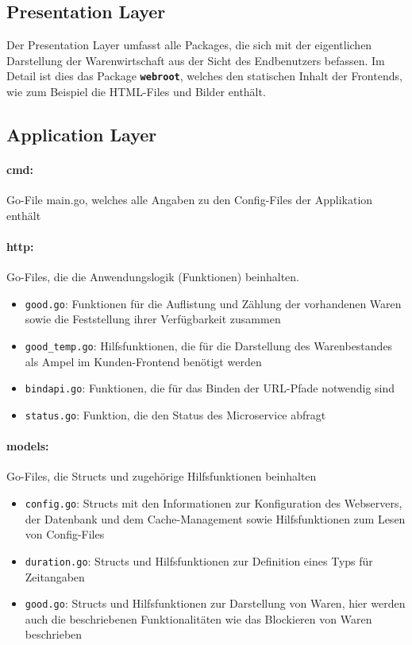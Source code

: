 \newpage
\subsection{Presentation Layer}
\label{subsec: Presentation Layer}
Der Presentation Layer umfasst alle  Packages, die sich mit der eigentlichen Darstellung der Warenwirtschaft aus der Sicht des Endbenutzers befassen. Im Detail ist dies das Package \textbf{\texttt{webroot}}, welches den statischen Inhalt der Frontends, wie zum Beispiel die HTML-Files und Bilder enthält.


\subsection{Application Layer}
\label{subsec: Application Layer}

\paragraph{cmd:} Go-File main.go, welches alle Angaben zu den Config-Files der Applikation enthält

\paragraph{http:} Go-Files, die die Anwendungslogik (Funktionen) beinhalten.
	\begin{itemize}
	\item \texttt{good.go}: Funktionen für die Auflistung und Zählung der vorhandenen Waren sowie die Feststellung ihrer Verfügbarkeit zusammen
	\item \texttt{good\_temp.go}: Hilfsfunktionen, die für die Darstellung des Warenbestandes als Ampel im Kunden-Frontend benötigt werden
	\item \texttt{bindapi.go}: Funktionen, die für das Binden der URL-Pfade notwendig sind
	\item \texttt{status.go}: Funktion, die den Status des Microservice abfragt 
	\end{itemize}


\paragraph{models:} Go-Files, die Structs und zugehörige Hilfsfunktionen beinhalten
	\begin{itemize}
	\item \texttt{config.go}: Structs mit den Informationen zur Konfiguration des Webservers, der Datenbank und dem Cache-Management sowie Hilfsfunktionen zum Lesen von Config-Files
	\item \texttt{duration.go}: Structs und Hilfsfunktionen zur Definition eines Typs für Zeitangaben
	\item \texttt{good.go}: Structs und Hilfsfunktionen zur Darstellung von Waren, hier werden auch die beschriebenen Funktionalitäten wie das Blockieren von Waren beschrieben
	\end{itemize}


